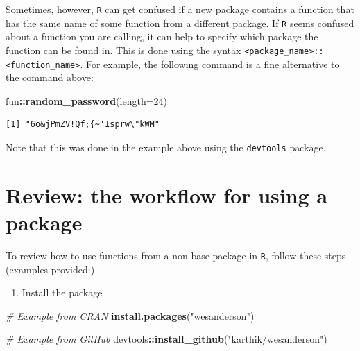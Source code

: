 \documentclass[
]{book}
\newenvironment{Shaded}{\begin{snugshade}}{\end{snugshade}}
\newcommand{\CommentTok}[1]{\textcolor[rgb]{0.56,0.35,0.01}{\textit{#1}}}
\newcommand{\DataTypeTok}[1]{\textcolor[rgb]{0.13,0.29,0.53}{#1}}
\newcommand{\DecValTok}[1]{\textcolor[rgb]{0.00,0.00,0.81}{#1}}
\newcommand{\KeywordTok}[1]{\textcolor[rgb]{0.13,0.29,0.53}{\textbf{#1}}}
\newcommand{\NormalTok}[1]{#1}
\newcommand{\OperatorTok}[1]{\textcolor[rgb]{0.81,0.36,0.00}{\textbf{#1}}}
\newcommand{\StringTok}[1]{\textcolor[rgb]{0.31,0.60,0.02}{#1}}
\providecommand{\tightlist}{%
  \setlength{\itemsep}{0pt}\setlength{\parskip}{0pt}}
\begin{document}
Sometimes, however, \texttt{R} can get confused if a new package contains a function that has the same name of some function from a different package. If \texttt{R} seems confused about a function you are calling, it can help to specify which package the function can be found in. This is done using the syntax \texttt{\textless{}package\_name\textgreater{}::\textless{}function\_name\textgreater{}}. For example, the following command is a fine alternative to the command above:

\begin{Shaded}
\begin{Highlighting}[]
\NormalTok{fun}\OperatorTok{::}\KeywordTok{random_password}\NormalTok{(}\DataTypeTok{length=}\DecValTok{24}\NormalTok{)}
\end{Highlighting}
\end{Shaded}

\begin{verbatim}
[1] "6o&jPmZV!Qf;{~'Isprw\"kWM"
\end{verbatim}

Note that this was done in the example above using the \texttt{devtools} package.

\hypertarget{review-the-workflow-for-using-a-package}{%
\section*{Review: the workflow for using a package}\label{review-the-workflow-for-using-a-package}}

To review how to use functions from a non-base package in \texttt{R}, follow these steps (examples provided:)

\begin{enumerate}
\def\labelenumi{\arabic{enumi}.}
\tightlist
\item
  Install the package
\end{enumerate}

\begin{Shaded}
\begin{Highlighting}[]
\CommentTok{# Example from CRAN}
\KeywordTok{install.packages}\NormalTok{(}\StringTok{"wesanderson"}\NormalTok{)}

\CommentTok{# Example from GitHub}
\NormalTok{devtools}\OperatorTok{::}\KeywordTok{install_github}\NormalTok{(}\StringTok{"karthik/wesanderson"}\NormalTok{)}
\end{Highlighting}
\end{Shaded}
\end{document}
